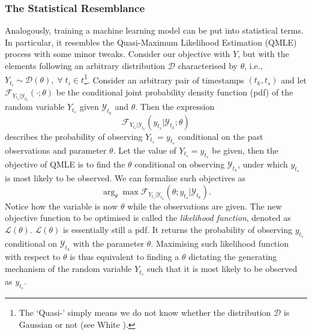 \subsubsection{The Statistical Resemblance}
Analogously, training a machine learning model can be put into statistical terms. In particular, it resembles the Quasi-Maximum Likelihood Estimation (QMLE) process with some minor tweaks. Consider our objective with $Y$, but with the elements following an arbitrary distribution $\mathcal{D}$ characterised by $\theta$, i.e., $Y_{t_i} \sim \mathcal{D}(\theta), \; \forall \; t_i \in t$\footnote{The `Quasi-' simply means we do not know whether the distribution $\mathcal{D}$ is Gaussian or not (see White \citeyear{white1982maximum}).}. Consider an arbitrary pair of timestamps $(t_k, t_s)$ and let $\mathcal{F}_{Y_{t_s} | \mathcal{Y}_{t_k}}(\cdot; \theta)$ be the conditional joint probability density function (pdf) of the random variable $Y_{t_s}$ given $\mathcal{Y}_{t_k}$ and $\theta$. Then the expression
\begin{equation*}
    \mathcal{F}_{Y_{t_s} | \mathcal{Y}_{t_k}}(y_{t_s}| \mathcal{Y}_{t_k} ; \theta)
\end{equation*}
describes the probability of observing $Y_{t_s} = y_{t_s}$ conditional on the past observations and parameter $\theta$. Let the value of $Y_{t_s} = y_{t_s}$ be given, then the objective of QMLE is to find the $\theta$ conditional on observing $\mathcal{Y}_{t_k}$, under which $y_{t_s}$ is most likely to be observed. We can formalise such objectives as
\begin{equation*}
    \arg_{\theta} \max \mathcal{F}_{Y_{t_s} | \mathcal{Y}_{t_k}}(\theta ; y_{t_s} | \mathcal{Y}_{t_k}).
\end{equation*}
Notice how the variable is now $\theta$ while the observations are given. The new objective function to be optimised is called the \textit{likelihood function}, denoted as $\mathcal{L}(\theta)$. $\mathcal{L}(\theta)$ is essentially still a pdf. It returns the probability of observing $y_{t_s}$ conditional on $\mathcal{Y}_{t_k}$ with the parameter $\theta$. Maximising such likelihood function with respect to $\theta$ is thus equivalent to finding a $\theta$ dictating the generating mechanism of the random variable $Y_{t_s}$ such that it is most likely to be observed as $y_{t_s}$.

